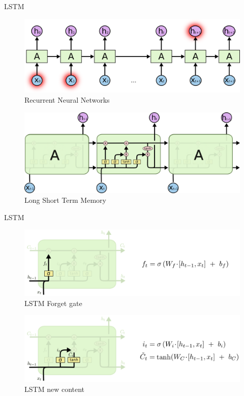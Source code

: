 ﻿\documentclass[table,aspectratio=43,mathserif,xcolor={usenames,dvipsnames,svgnames,table},10pt]{beamer}
\begin{document}
\begin{frame}{LSTM}
 \begin{figure}[h]
    \includegraphics[width=0.4\linewidth]{images/rnn_n.png}  
    \caption{Recurrent Neural Networks}
  \end{figure}
   \begin{figure}[h]
    \includegraphics[width=0.6\linewidth]{images/lstm.png}  
    \caption{Long Short Term Memory}
  \end{figure}
\end{frame}


\begin{frame}{LSTM}
 \begin{figure}[h]
    \includegraphics[width=0.6\linewidth]{images/lstm_forget.png}  
    \caption{LSTM Forget gate}
  \end{figure}
   \begin{figure}[h]
    \includegraphics[width=0.6\linewidth]{images/lstm_add.png}  
    \caption{LSTM new content}
  \end{figure}
\end{frame}
\end{document}
